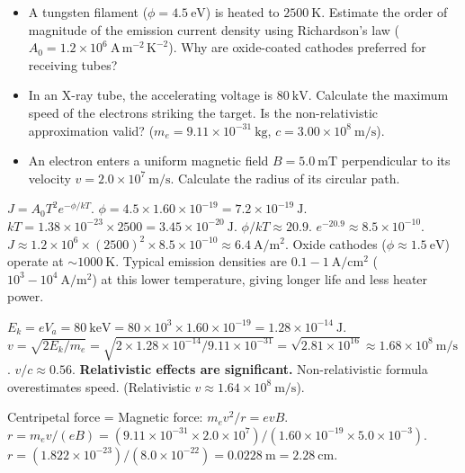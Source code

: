 \documentclass[11pt]{article}
\begin{document}
\begin{exercice}
\begin{itemize}
\item A tungsten filament ($\phi = 4.5\ \mathrm{eV}$) is heated to $2500\ \mathrm{K}$. Estimate the order of magnitude of the emission current density using Richardson's law ($A_0 = 1.2 \times 10^6\ \mathrm{A\,m^{-2}\,K^{-2}}$). Why are oxide-coated cathodes preferred for receiving tubes?
\item In an X-ray tube, the accelerating voltage is $80\ \mathrm{kV}$. Calculate the maximum speed of the electrons striking the target. Is the non-relativistic approximation valid? ($m_e = 9.11 \times 10^{-31}\ \mathrm{kg}$, $c = 3.00 \times 10^8\ \mathrm{m/s}$).
\item An electron enters a uniform magnetic field $B = 5.0\ \mathrm{mT}$ perpendicular to its velocity $v = 2.0 \times 10^7\ \mathrm{m/s}$. Calculate the radius of its circular path.
\end{itemize}
\end{exercice}

\begin{corrige}[Exercise 1]
$J = A_0 T^2 e^{-\phi/kT}$.
$\phi = 4.5 \times 1.60 \times 10^{-19} = 7.2 \times 10^{-19}\ \mathrm{J}$.
$kT = 1.38 \times 10^{-23} \times 2500 = 3.45 \times 10^{-20}\ \mathrm{J}$.
$\phi/kT \approx 20.9$.
$e^{-20.9} \approx 8.5 \times 10^{-10}$.
$J \approx 1.2 \times 10^6 \times (2500)^2 \times 8.5 \times 10^{-10} \approx 6.4\ \mathrm{A/m^2}$.
Oxide cathodes ($\phi \approx 1.5\ \mathrm{eV}$) operate at $\sim 1000\ \mathrm{K}$. Typical emission densities are $0.1-1\ \mathrm{A/cm^2}$ ($10^3-10^4\ \mathrm{A/m^2}$) at this lower temperature, giving longer life and less heater power.
\end{corrige}

\begin{corrige}[Exercise 2]
$E_k = e V_a = 80\ \mathrm{keV} = 80 \times 10^3 \times 1.60 \times 10^{-19} = 1.28 \times 10^{-14}\ \mathrm{J}$.
$v = \sqrt{2E_k/m_e} = \sqrt{2 \times 1.28 \times 10^{-14} / 9.11 \times 10^{-31}} = \sqrt{2.81 \times 10^{16}} \approx 1.68 \times 10^8\ \mathrm{m/s}$.
$v/c \approx 0.56$. \textbf{Relativistic effects are significant.} Non-relativistic formula overestimates speed. (Relativistic $v \approx 1.64 \times 10^8\ \mathrm{m/s}$).
\end{corrige}

\begin{corrige}[Exercise 3]
Centripetal force = Magnetic force: $m_e v^2 / r = e v B$.
$r = m_e v / (e B) = (9.11 \times 10^{-31} \times 2.0 \times 10^7) / (1.60 \times 10^{-19} \times 5.0 \times 10^{-3})$.
$r = (1.822 \times 10^{-23}) / (8.0 \times 10^{-22}) = 0.0228\ \mathrm{m} = 2.28\ \mathrm{cm}$.
\end{corrige}
\end{document}
